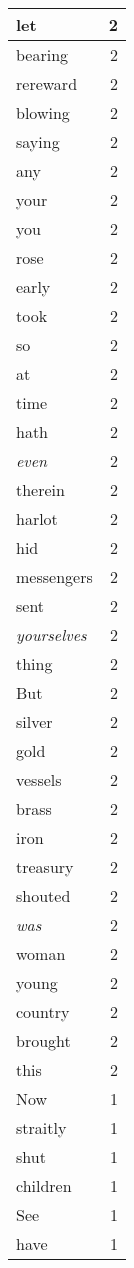 \begin{center}
\begin{longtable}{l|r}
let & 2 \\ \hline
bearing & 2 \\ \hline
rereward & 2 \\ \hline
blowing & 2 \\ \hline
saying & 2 \\ \hline
any & 2 \\ \hline
your & 2 \\ \hline
you & 2 \\ \hline
rose & 2 \\ \hline
early & 2 \\ \hline
took & 2 \\ \hline
so & 2 \\ \hline
at & 2 \\ \hline
time & 2 \\ \hline
hath & 2 \\ \hline
\emph{even} & 2 \\ \hline
therein & 2 \\ \hline
harlot & 2 \\ \hline
hid & 2 \\ \hline
messengers & 2 \\ \hline
sent & 2 \\ \hline
\emph{yourselves} & 2 \\ \hline
thing & 2 \\ \hline
But & 2 \\ \hline
silver & 2 \\ \hline
gold & 2 \\ \hline
vessels & 2 \\ \hline
brass & 2 \\ \hline
iron & 2 \\ \hline
treasury & 2 \\ \hline
shouted & 2 \\ \hline
\emph{was} & 2 \\ \hline
woman & 2 \\ \hline
young & 2 \\ \hline
country & 2 \\ \hline
brought & 2 \\ \hline
this & 2 \\ \hline
Now & 1 \\ \hline
straitly & 1 \\ \hline
shut & 1 \\ \hline
children & 1 \\ \hline
See & 1 \\ \hline
have & 1 \\ \hline

\end{longtable}
\end{center}
